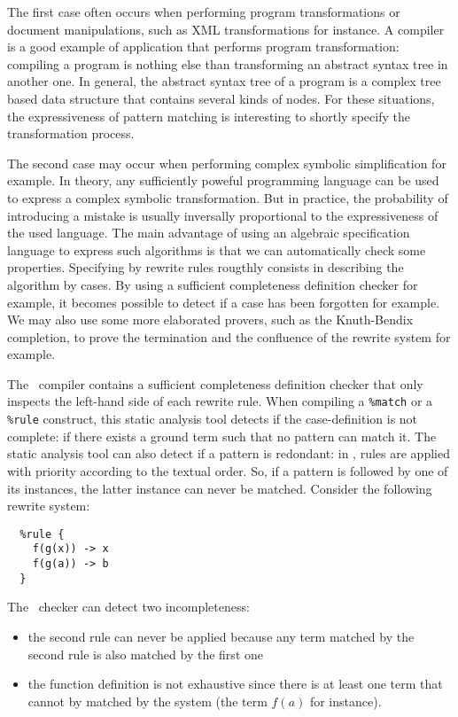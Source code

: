The first case often occurs when performing program transformations or
document manipulations, such as XML transformations for instance.
A compiler is a good example of application that performs program
transformation: compiling a program is nothing else than transforming
an abstract syntax tree in another one.   
In general, the abstract syntax tree of a program is a complex tree
based data structure that contains several kinds of nodes.
For these situations, the expressiveness of pattern matching is
interesting to shortly specify the transformation process.

The second case may occur when performing complex symbolic simplification
for example. 
In theory, any sufficiently poweful programming language can be used
to express a complex symbolic transformation. But in practice, 
the probability of introducing a mistake is usually inversally
proportional to the expressiveness of the used language.
The main advantage of using an algebraic specification language to
express such algorithms is that we can automatically check some
properties.
Specifying by rewrite rules rougthly consists in describing the
algorithm by cases. By using a sufficient completeness definition
checker for example, it becomes possible to detect if a case has been
forgotten for example. 
We may also use some more elaborated provers, such as the Knuth-Bendix completion, to
prove the termination and the confluence of the rewrite system for
example.

The \TOM\ compiler contains a sufficient completeness definition
checker that only inspects the left-hand side of each rewrite rule.
When compiling a \texttt{\%match} or a \texttt{\%rule} construct, this
static analysis tool detects if the case-definition is not complete:
if there exists a ground term such that no pattern can match it.
The static analysis tool can also detect if a pattern is
redondant: in \TOM, rules are applied with priority according to the
textual order. So, if a pattern is followed by one of its instances,
the latter instance can never be matched. 
Consider the following rewrite system:
\begin{verbatim}
  %rule {
    f(g(x)) -> x
    f(g(a)) -> b
  }
\end{verbatim}

The \TOM\ checker can detect two incompleteness:
\begin{itemize}
\item the second rule can never be applied because any term matched by
  the second rule is also matched by the first one
\item the function definition is not exhaustive since there is at least
  one term that cannot by matched by the system (the term $f(a)$ for
  instance). 
\end{itemize}

